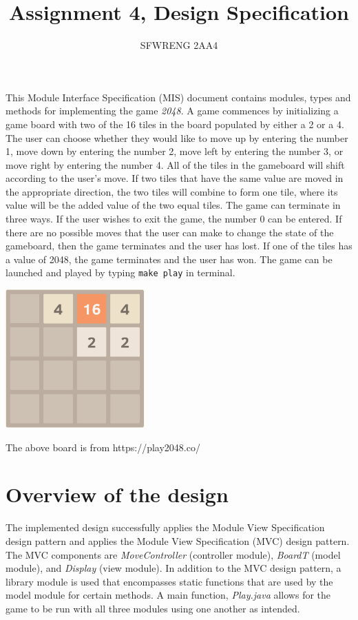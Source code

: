 \documentclass[12pt]{article}
\title{Assignment 4, Design Specification}
\author{SFWRENG 2AA4}
\begin{document}
\maketitle
This Module Interface Specification (MIS) document contains modules, types and
methods for implementing the game \textit{2048}. A game commences by initializing a game board with two of the 16 tiles in the board populated by either a 2 or a 4. The user can choose whether they would like to move up by entering the number 1, move down by entering the number 2, move left by entering the number 3, or move right by entering the number 4. All of the tiles in the gameboard will shift according to the user's move. If two tiles that have the same value are moved in the appropriate direction, the two tiles will combine to form one tile, where its value will be the added value of the two equal tiles. The game can terminate in three ways. If the user wishes to exit the game, the number 0 can be entered. If there are no possible moves that the user can make to change the state of the gameboard, then the game terminates and the user has lost. If one of the tiles has a value of 2048, the game terminates and the user has won. The game can be launched and played by typing \texttt{make play} in terminal.

\begin{center}
  \includegraphics[width=0.4\textwidth]{2048.png}

  The above board is from https://play2048.co/
\end{center}

\newpage

\section{Overview of the design}

The implemented design successfully applies the Module View Specification design pattern and applies the Module View Specification (MVC) design pattern. The MVC components
are \textit{MoveController} (controller module), \textit{BoardT} (model module), and \textit{Display} (view module). In addition to the MVC design pattern, a library module is used that encompasses static functions that are used by the model module for certain methods. A main function, \textit{Play.java} allows for the game to be run with all three modules using one another as intended. 
\end{document}
